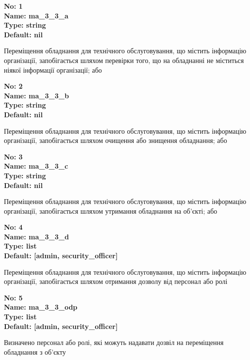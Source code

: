 \documentclass{article}
\begin{document}
\vspace{10pt}
{\footnotesize\bfseries
No: 1\\
Name: ma\_\allowbreak{}3\_\allowbreak{}3\_\allowbreak{}a\\
Type: string\\
Default: nil
}

{\footnotesize Переміщення обладнання для технічного обслуговування, що містить інформацію організації, запобігається шляхом перевірки того, що на обладнанні не міститься ніякої інформації організації; або}


{\footnotesize\bfseries
No: 2\\
Name: ma\_\allowbreak{}3\_\allowbreak{}3\_\allowbreak{}b\\
Type: string\\
Default: nil
}

{\footnotesize Переміщення обладнання для технічного обслуговування, що містить інформацію організації, запобігається шляхом очищення або знищення обладнання; або}


{\footnotesize\bfseries
No: 3\\
Name: ma\_\allowbreak{}3\_\allowbreak{}3\_\allowbreak{}c\\
Type: string\\
Default: nil
}

{\footnotesize Переміщення обладнання для технічного обслуговування, що містить інформацію організації, запобігається шляхом утримання обладнання на об'єкті; або}


{\footnotesize\bfseries
No: 4\\
Name: ma\_\allowbreak{}3\_\allowbreak{}3\_\allowbreak{}d\\
Type: list\\
Default: [\textquotedbl{}admin\textquotedbl{}, \textquotedbl{}security\_\allowbreak{}officer\textquotedbl{}]
}

{\footnotesize Переміщення обладнання для технічного обслуговування, що містить інформацію організації, запобігається шляхом отримання дозволу від персонал або ролі}


{\footnotesize\bfseries
No: 5\\
Name: ma\_\allowbreak{}3\_\allowbreak{}3\_\allowbreak{}odp\\
Type: list\\
Default: [\textquotedbl{}admin\textquotedbl{}, \textquotedbl{}security\_\allowbreak{}officer\textquotedbl{}]
}

{\footnotesize Визначено персонал або ролі, які можуть надавати дозвіл на переміщення обладнання з об'єкту}
\end{document}
